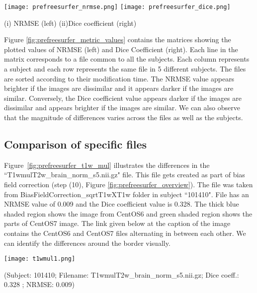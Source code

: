 \begin{center}
\texttt{[image: prefreesurfer\_nrmse.png]}%
\texttt{[image: prefreesurfer\_dice.png]}
\caption*{(i) NRMSE (left) (ii)Dice coefficient (right)}
\label{fig:prefreesurfer_metric_values}
\end{center}

Figure \ref{fig:prefreesurfer_metric_values} contains the matrices showing the plotted values of NRMSE (left) and Dice Coefficient (right).
Each line in the matrix corresponds to a file common to all the subjects.
Each column represents a subject and each row represents the same file in 5 different subjects. The files are sorted according to their modification time.
The NRMSE value appears brighter if the images are dissimilar and it appears darker if the images are similar. Conversely, the Dice coefficient value appears darker if the images are dissimilar and appears brighter if the images are similar. We can also observe that the magnitude of differences varies across the files as well as the subjects.

\subsection{Comparison of specific files}
Figure~\ref{fig:prefreesurfer_t1w_mul} illustrates the differences in the ``T1wmulT2w\_brain\_norm\_s5.nii.gz" file. This file gets created as part of bias field correction (step (10), Figure \ref{fig:prefreesurfer_overview}). The file was taken from BiasFieldCorrection\_sqrtT1wXT1w folder in subject ``101410". File has an NRMSE value of 0.009 and the Dice coefficient value is 0.328. The thick blue shaded region shows the image from CentOS6 and green shaded region shows the parts of CentOS7 image.
The link given below at the caption of the image contains the CentOS6 and CentOS7 files alternating in between each other. We can identify the differences around the border visually.

\begin{center}
\texttt{[image: t1wmul1.png]}
\caption*{(Subject: 101410; Filename: T1wmulT2w\_brain\_norm\_s5.nii.gz; Dice coeff.: 0.328 ; NRMSE: 0.009)}
\label{fig:prefreesurfer_t1w_mul}
\end{center}

